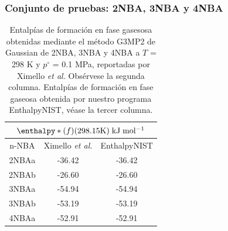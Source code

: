 \documentclass{beamer}
\begin{document}

\begin{frame}
\frametitle{Conjunto de pruebas: 2NBA, 3NBA y 4NBA}
\begin{table}[H]
\centering
\begin{tabular}{|c|c|c|}
\hline
	\multicolumn{3}{||c||}{$\enthalpy*(f){}(298.15 \mathrm{K})\; \mathrm{kJ\;mol^{-1}}$}\\
\hline
\hline
	n-NBA & Ximello \textit{et al.} & EnthalpyNIST\\ 
\hline 
2NBAa & -36.42 & -36.42\\
\hline
2NBAb & -26.60 & -26.60\\ 
\hline 
3NBAa & -54.94 & -54.94\\
\hline
3NBAb & -53.19 & -53.19\\ 
\hline 
4NBAa & -52.91 & -52.91\\ 
\hline  
\end{tabular} 
	\caption{Entalpías de formación en fase gasesosa obtenidas mediante el método G3MP2 de Gaussian de 2NBA, 3NBA y 4NBA a $T$ = 298 K y $p^{\circ}$ = 0.1 MPa, reportadas por Ximello \textit{et al.} Obsérvese la segunda columna. Entalpías de formación en fase gaseosa obtenida por nuestro programa EnthalpyNIST, véase la tercer columna.}
\label{Ximello-table-2}
\end{table}
\end{frame}
\end{document}
